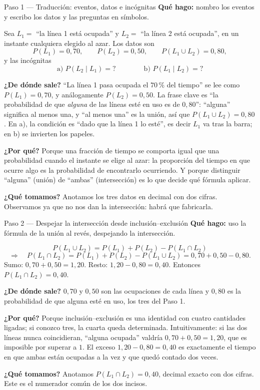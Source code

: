 \documentclass[11pt]{article}
\begin{document}
\begin{paso}{Paso 1 --- Traducción: eventos, datos e incógnitas}
\textbf{Qué hago:} nombro los eventos y escribo los datos y las preguntas en símbolos.

Sea $L_1=$ ``la línea 1 está ocupada'' y $L_2=$ ``la línea 2 está ocupada'', en un instante cualquiera elegido al azar. Los datos son
\[
P(L_1)=0{,}70,\qquad P(L_2)=0{,}50,\qquad P(L_1\cup L_2)=0{,}80,
\]
y las incógnitas
\[
\text{a) } P(L_2\mid L_1)=?
\qquad\qquad
\text{b) } P(L_1\mid L_2)=?
\]

\textbf{¿De dónde sale?} ``La línea 1 pasa ocupada el $70\,\%$ del tiempo'' se lee como $P(L_1)=0{,}70$, y análogamente $P(L_2)=0{,}50$. La frase clave es ``la probabilidad de que \emph{alguna} de las líneas esté en uso es de $0{,}80$'': ``alguna'' significa al menos una, y ``al menos una'' es la unión, así que $P(L_1\cup L_2)=0{,}80$. En a), la condición es ``dado que la línea 1 lo esté'', es decir $L_1$ va tras la barra; en b) se invierten los papeles.

\textbf{¿Por qué?} Porque una fracción de tiempo se comporta igual que una probabilidad cuando el instante se elige al azar: la proporción del tiempo en que ocurre algo es la probabilidad de encontrarlo ocurriendo. Y porque distinguir ``alguna'' (unión) de ``ambas'' (intersección) es lo que decide qué fórmula aplicar.

\textbf{¿Qué tomamos?} Anotamos los tres datos en decimal con dos cifras. Observamos ya que no nos dan la intersección: habrá que fabricarla.
\end{paso}

\begin{paso}{Paso 2 --- Despejar la intersección desde inclusión--exclusión}
\textbf{Qué hago:} uso la fórmula de la unión al revés, despejando la intersección.

\[
P(L_1\cup L_2)=P(L_1)+P(L_2)-P(L_1\cap L_2)
\]
\[
\Longrightarrow\quad
P(L_1\cap L_2)=P(L_1)+P(L_2)-P(L_1\cup L_2)=0{,}70+0{,}50-0{,}80.
\]
Sumo: $0{,}70+0{,}50=1{,}20$. Resto: $1{,}20-0{,}80=0{,}40$. Entonces $P(L_1\cap L_2)=0{,}40$.

\textbf{¿De dónde sale?} $0{,}70$ y $0{,}50$ son las ocupaciones de cada línea y $0{,}80$ es la probabilidad de que alguna esté en uso, los tres del Paso 1.

\textbf{¿Por qué?} Porque inclusión--exclusión es una identidad con cuatro cantidades ligadas; si conozco tres, la cuarta queda determinada. Intuitivamente: si las dos líneas nunca coincidieran, ``alguna ocupada'' valdría $0{,}70+0{,}50=1{,}20$, que es imposible por superar a $1$. El exceso $1{,}20-0{,}80=0{,}40$ es exactamente el tiempo en que ambas están ocupadas a la vez y que quedó contado dos veces.

\textbf{¿Qué tomamos?} Anotamos $P(L_1\cap L_2)=0{,}40$, decimal exacto con dos cifras. Este es el numerador común de los dos incisos.
\end{paso}
\end{document}
